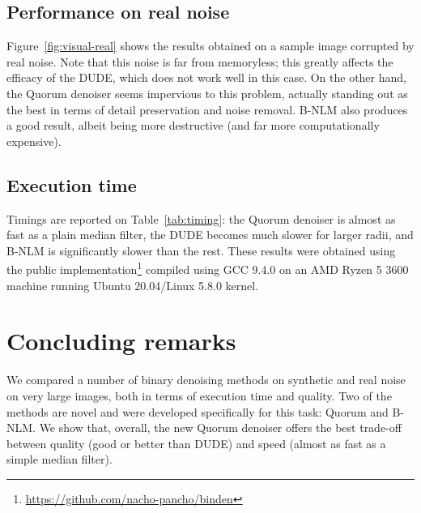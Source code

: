 \documentclass{article}
\begin{document}
\subsection{Performance on real noise}

Figure~\ref{fig:visual-real} shows the results obtained on a sample image corrupted by real noise. Note that this noise is far from memoryless; this greatly affects the efficacy of the DUDE, which does not work well in this case. On the other hand, the Quorum denoiser seems impervious to this problem, actually standing out as the best in terms of detail preservation and noise removal. B-NLM also produces a good result, albeit being more destructive (and far more computationally expensive).

\subsection{Execution time} 
Timings are reported on Table~\ref{tab:timing}: the Quorum denoiser is almost as fast as a plain median filter, the DUDE becomes much slower for larger radii, and B-NLM is significantly slower than the rest. These results were obtained using the public implementation\footnote{\url{https://github.com/nacho-pancho/binden}} compiled using GCC 9.4.0 on an AMD Ryzen 5 3600 machine running Ubuntu 20.04/Linux 5.8.0 kernel.


\section{Concluding remarks}
We compared a number of binary denoising methods on synthetic and real noise on very large images, both in terms of execution time and quality. Two of the methods are novel and were developed specifically for this task: Quorum and B-NLM. We show that, overall, the new Quorum denoiser offers the best trade-off between quality (good or better than DUDE) and speed (almost as fast as a simple median filter).



\balance


\end{document}
